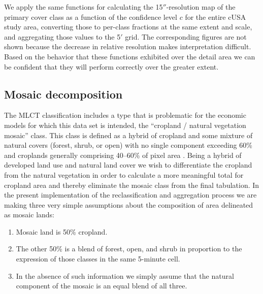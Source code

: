 We apply the same functions for calculating the 15$''$-resolution map
of the primary cover class as a function of the confidence level $c$
for the entire cUSA study area, converting those to per-class
fractions at the same extent and scale, and aggregating those values
to the 5$'$ grid.  The corresponding figures are not shown because the
decrease in relative resolution makes interpretation difficult.  Based
on the behavior that these functions exhibited over the detail area we
can be confident that they will perform correctly over the greater
extent.



\subsection{Mosaic decomposition}
\label{sec:decomposition}

The MLCT classification includes a type that is problematic for the
economic models for which this data set is intended, the ``cropland /
natural vegetation mosaic'' class.  This class is defined as a hybrid
of cropland and some mixture of natural covers (forest, shrub, or
open) with no single component exceeding 60\% \citep{Friedl2002} and
croplands generally comprising 40--60\% of pixel area . Being a hybrid of developed land use and natural land cover
we wish to differentiate the cropland from the natural vegetation in
order to calculate a more meaningful total for cropland area and
thereby eliminate the mosaic class from the final tabulation.  In the
present implementation of the reclassification and aggregation process
we are making three very simple assumptions about the composition of
area delineated as mosaic lands:

\begin{enumerate}
\item Mosaic land is 50\% cropland.
\item The other 50\% is a blend of forest, open, and shrub in
  proportion to the expression of those classes in the same 5-minute
  cell.
\item In the absence of such information we simply assume that the
  natural component of the mosaic is an equal blend of all three.
\end{enumerate}


